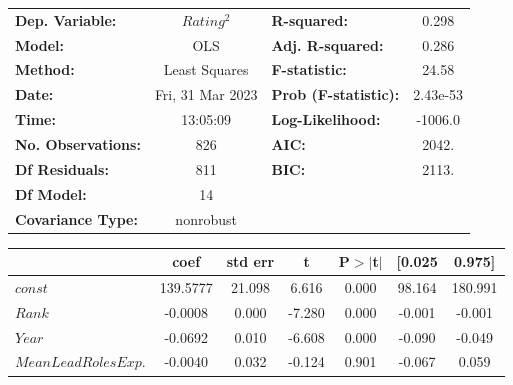         \begin{center}
            \begin{tabular}{lclc}
            \toprule
            \textbf{Dep. Variable:}            &     $Rating^2$     & \textbf{  R-squared:         } &     0.298   \\
            \textbf{Model:}                    &       OLS        & \textbf{  Adj. R-squared:    } &     0.286   \\
            \textbf{Method:}                   &  Least Squares   & \textbf{  F-statistic:       } &     24.58   \\
            \textbf{Date:}                     & Fri, 31 Mar 2023 & \textbf{  Prob (F-statistic):} &  2.43e-53   \\
            \textbf{Time:}                     &     13:05:09     & \textbf{  Log-Likelihood:    } &   -1006.0   \\
            \textbf{No. Observations:}         &         826      & \textbf{  AIC:               } &     2042.   \\
            \textbf{Df Residuals:}             &         811      & \textbf{  BIC:               } &     2113.   \\
            \textbf{Df Model:}                 &          14      & \textbf{                     } &             \\
            \textbf{Covariance Type:}          &    nonrobust     & \textbf{                     } &             \\
            \bottomrule
            \end{tabular}
            \begin{tabular}{lcccccc}
                                               & \textbf{coef} & \textbf{std err} & \textbf{t} & \textbf{P$> |$t$|$} & \textbf{[0.025} & \textbf{0.975]}  \\
            \midrule
            \textbf{$const$}                 &     139.5777  &       21.098     &     6.616  &         0.000        &       98.164    &      180.991     \\
            \textbf{$Rank$}                  &      -0.0008  &        0.000     &    -7.280  &         0.000        &       -0.001    &       -0.001     \\
            \textbf{$Year$}                  &      -0.0692  &        0.010     &    -6.608  &         0.000        &       -0.090    &       -0.049     \\
            \textbf{$Mean Lead Roles Exp.$}  &      -0.0040  &        0.032     &    -0.124  &         0.901        &       -0.067    &        0.059     \\

\end{tabular}
\end{center}
